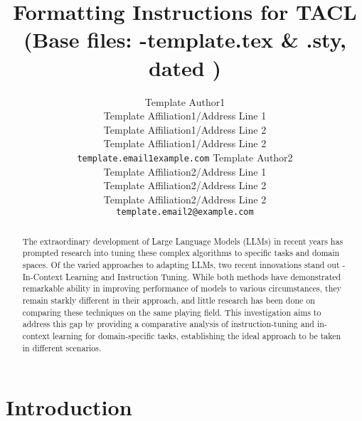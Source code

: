 \documentclass[11pt,a4paper]{article}
\title{Formatting Instructions for TACL \TaclPapers \\
(Base files: \styleFileVersion-template.tex \& \styleFileVersion.sty, dated \dateOfLastUpdate)}
\author{
  Template Author1\Thanks{The {\em actual} contributors to this instruction
    document and corresponding template file are given in Section
    \ref{sec:contributors}.} 
  \\
  Template Affiliation1/Address Line 1
  \\
  Template Affiliation1/Address Line 2
  \\
  Template Affiliation1/Address Line 2
  \\
  \texttt{template.email1example.com}
  \And
  Template Author2 
  \\
  Template Affiliation2/Address Line 1
  \\
  Template Affiliation2/Address Line 2
  \\
  Template Affiliation2/Address Line 2
  \\
  \texttt{template.email2@example.com}
}
\date{}
\begin{document}
\maketitle
\begin{abstract}
  The extraordinary development of Large Language Models (LLMs) in recent years has prompted research into tuning these complex algorithms 
  to specific tasks and domain spaces. Of the varied approaches to adapting LLMs, two recent innovations stand out - In-Context Learning 
  and Instruction Tuning. While both methods have demonstrated remarkable ability in improving performance of models to various circumstances, 
  they remain starkly different in their approach, and little research has been done on comparing these techniques on the same playing field. This 
  investigation aims to address this gap by providing a comparative analysis of instruction-tuning and in-context learning for domain-specific 
  tasks, establishing the ideal approach to be taken in different scenarios.
\end{abstract}

\iftaclpubformat
\section{Introduction}
\end{document}
